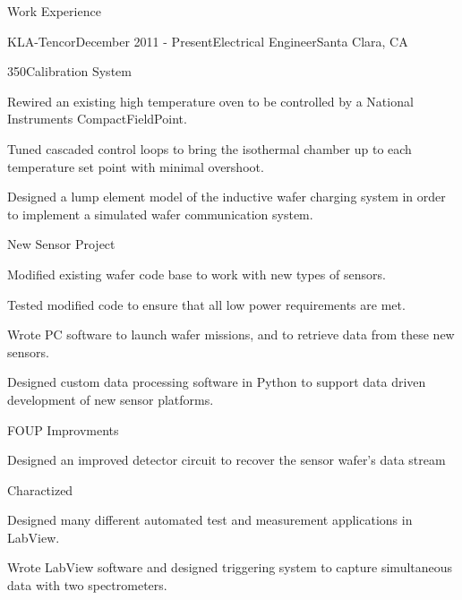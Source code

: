 \documentclass{resume} %
\begin{document}

\begin{rSection}{Work Experience}

\begin{rSubsection}{KLA-Tencor}{December 2011 - Present}{Electrical Engineer}{Santa Clara, CA}

\begin{rWorkProject}{350\celsius \space Calibration System}
\item Rewired an existing high temperature oven to be controlled by a National Instruments CompactFieldPoint.
\item Tuned cascaded control loops to bring the isothermal chamber up to each temperature set point with minimal overshoot.
\item Designed a lump element model of the inductive wafer charging system in order to implement a simulated wafer communication system.
\end{rWorkProject}

\begin{rWorkProject}{New Sensor Project}
\item Modified existing wafer code base to work with new types of sensors.

\item Tested modified code to ensure that all low power requirements are met.
\item Wrote PC software to launch wafer missions, and to retrieve data from these new sensors.
\item Designed custom data processing software in Python to support data driven development of new sensor platforms.
\end{rWorkProject}

\begin{rWorkProject}{FOUP Improvments}
\item Designed an improved detector circuit to recover the sensor wafer's data stream
\item Charactized 
\end{rWorkProject}

\item Designed many different automated test and measurement applications in LabView.
\item Wrote LabView software and designed triggering system to capture simultaneous data with two spectrometers.
\end{rSubsection}


\end{rSection}
\end{document}
